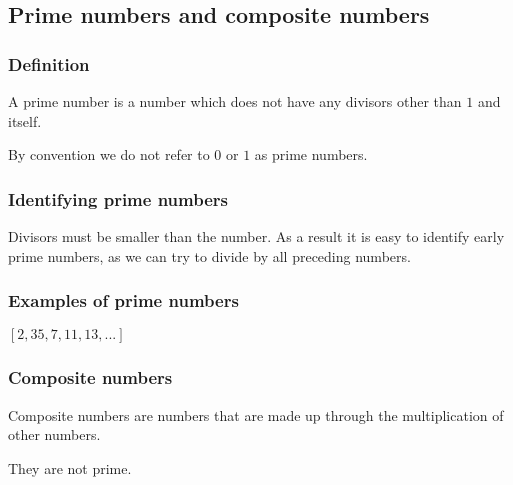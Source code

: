 
\subsection{Prime numbers and composite numbers}

\subsubsection{Definition}

A prime number is a number which does not have any divisors other than \(1\) and itself.

By convention we do not refer to \(0\) or \(1\) as prime numbers.

\subsubsection{Identifying prime numbers}

Divisors must be smaller than the number. As a result it is easy to identify early prime numbers, as we can try to divide by all preceding numbers.

\subsubsection{Examples of prime numbers}

$[2, 3 5, 7, 11, 13,...]$

\subsubsection{Composite numbers}

Composite numbers are numbers that are  made up through the multiplication of other numbers.

They are not prime.

